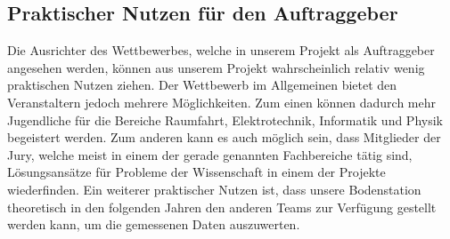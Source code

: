 \subsection{Praktischer Nutzen für den Auftraggeber}
Die Ausrichter des Wettbewerbes, welche in unserem Projekt als Auftraggeber angesehen werden, können aus unserem Projekt wahrscheinlich relativ wenig praktischen Nutzen ziehen. Der Wettbewerb im Allgemeinen bietet den Veranstaltern jedoch mehrere Möglichkeiten. Zum einen können dadurch mehr Jugendliche für die Bereiche Raumfahrt, Elektrotechnik, Informatik und Physik begeistert werden. Zum anderen kann es auch möglich sein, dass Mitglieder der Jury, welche meist in einem der gerade genannten Fachbereiche tätig sind, Lösungsansätze für Probleme der Wissenschaft in einem der Projekte wiederfinden. Ein weiterer praktischer Nutzen ist, dass unsere Bodenstation theoretisch in den folgenden Jahren den anderen Teams zur Verfügung gestellt werden kann, um die gemessenen Daten auszuwerten.

